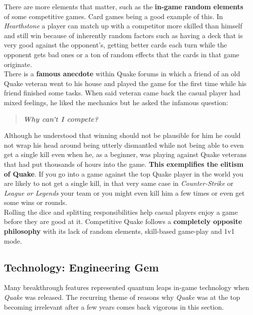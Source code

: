 There are more elements that matter, such as the \textbf{in-game random elements} of some competitive games. Card games being a good example of this. In \textit{Hearthstone} \citep{game:hs} a player can match up with a competitor more skilled than himself and still win because of inherently random factors such as having a deck that is very good against the opponent's, getting better cards each turn while the opponent gets bad ones or a ton of random effects that the cards in that game originate.\\

There is a \textbf{famous anecdote} within Quake forums in which a friend of an old Quake veteran went to his house and played the game for the first time while his friend finished some tasks. When said veteran came back the casual player had mixed feelings, he liked the mechanics but he asked the infamous question:

\begin{quote}
\begin{center}
\textit{\textbf{Why can't I compete?}}
\end{center}
\end{quote}

Although he understood that winning should not be plausible for him he could not wrap his head around being utterly dismantled while not being able to even get a single kill even when he, as a beginner, was playing against Quake veterans that had put thousands of hours into the game. \textbf{This exemplifies the elitism of Quake}. If you go into a game against the top Quake player in the world you are likely to not get a single kill, in that very same case in \textit{Counter-Strike} or \textit{League or Legends} your team or you might even kill him a few times or even get some wins or rounds.\\

Rolling the dice and splitting responsibilities help casual players enjoy a game before they are good at it. Competitive Quake follows a \textbf{completely opposite philosophy} with its lack of random elements, skill-based game-play and 1v1 mode.\\ 


\subsection{Technology: Engineering Gem}

Many breakthrough features represented quantum leaps in-game technology when \textit{Quake} was released. The recurring theme of reasons why \textit{Quake} was at the top becoming irrelevant after a few years comes back vigorous in this section.\\

